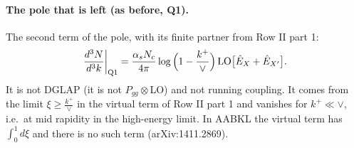 \documentclass[10pt]{article}
\numberwithin{equation}{section}
\begin{document}
\paragraph{The pole that is left (as before, Q1).} The second term of the pole, with its finite partner from Row II part 1:
\begin{equation}
\frac{d^3N}{d^3k}\bigg|_{\rm Q1}=\frac{\alpha_sN_c}{4\pi}\log\Big(1-\frac{k^+}{\vee}\Big)\,{\rm LO}\big[\hat E_X+\hat E_{X'}\big].
\label{eq:q1}
\end{equation}
It is not DGLAP (it is not $P_{gg}\otimes$LO) and not running coupling. It comes from the limit $\xi\ge\frac{k^+}{\vee}$ in the virtual term of Row II part 1 and vanishes for $k^+\ll\vee$, i.e.\ at mid rapidity in the high-energy limit. In AABKL the virtual term has $\int_0^1d\xi$ and there is no such term (arXiv:1411.2869).
\end{document}
